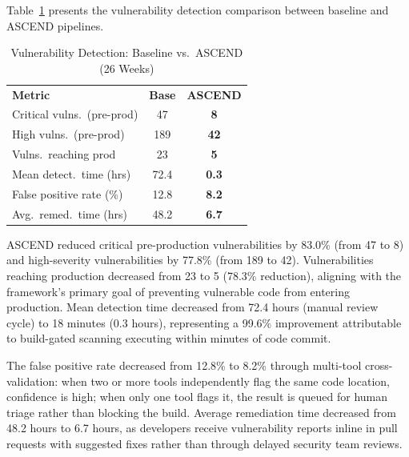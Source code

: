 \documentclass[journal]{IEEEtran}
\begin{document}
Table~\ref{tab:vulns} presents the vulnerability detection comparison between baseline and ASCEND pipelines.

\begin{table}[h]
\centering
\caption{Vulnerability Detection: Baseline vs.\ ASCEND (26 Weeks)}
\label{tab:vulns}
\scriptsize
\begin{tabular}{@{}lcc@{}}
\rowcolor{TableHeader}\color{white}\textbf{Metric} & \color{white}\textbf{Base} & \color{white}\textbf{ASCEND} \\
\rowcolor{IEEELightRed}Critical vulns.\ (pre-prod) & 47 & \textbf{8} \\
\rowcolor{TableAlt}High vulns.\ (pre-prod) & 189 & \textbf{42} \\
\rowcolor{IEEELightRed}Vulns.\ reaching prod & 23 & \textbf{5} \\
\rowcolor{TableAlt}Mean detect.\ time (hrs) & 72.4 & \textbf{0.3} \\
\rowcolor{IEEELightRed}False positive rate (\%) & 12.8 & \textbf{8.2} \\
\rowcolor{TableAlt}Avg.\ remed.\ time (hrs) & 48.2 & \textbf{6.7} \\
\end{tabular}
\end{table}

ASCEND reduced critical pre-production vulnerabilities by 83.0\% (from 47 to 8) and high-severity vulnerabilities by 77.8\% (from 189 to 42). Vulnerabilities reaching production decreased from 23 to 5 (78.3\% reduction), aligning with the framework's primary goal of preventing vulnerable code from entering production. Mean detection time decreased from 72.4 hours (manual review cycle) to 18 minutes (0.3 hours), representing a 99.6\% improvement attributable to build-gated scanning executing within minutes of code commit.

The false positive rate decreased from 12.8\% to 8.2\% through multi-tool cross-validation: when two or more tools independently flag the same code location, confidence is high; when only one tool flags it, the result is queued for human triage rather than blocking the build. Average remediation time decreased from 48.2 hours to 6.7 hours, as developers receive vulnerability reports inline in pull requests with suggested fixes rather than through delayed security team reviews.
\end{document}
